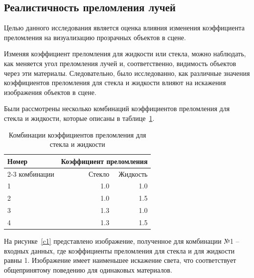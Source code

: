 \subsection{Реалистичность преломления лучей}

Целью данного исследования является оценка влияния изменения коэффициента преломления на визуализацию прозрачных объектов в сцене.

Изменяя коэффициент преломления для жидкости или стекла, можно наблюдать, как меняется угол преломления лучей и, соответственно, видимость объектов через эти материалы. Следовательно, было исследованно, как различные значения коэффициентов преломления для стекла и жидкости влияют на искажения изображения объектов в сцене.

Были рассмотрены несколько комбинаций коэффициентов преломления для стекла и жидкости, которые описаны в таблице~\ref{comb}.

\begin{table}[ht!]
	\begin{center}
		\caption{Комбинации коэффициентов преломления для стекла и жидкости}
		\begin{tabular}{ ||p{3cm}||r|r||  }
			\hline
			\multirow{2}{*}{Номер}& \multicolumn{2}{c||}{Коэффициент преломления} \\[1.5ex]
			\cline{2-3} 
			комбинации& ~~~~~~~Стекло & Жидкость \\ [1.5ex] 
			\hline\hline
			1 & 1.0 & 1.0 \\
			2 & 1.0 & 1.5 \\
			3 & 1.3 & 1.0 \\
			4 & 1.3 & 1.5 \\
			\hline
		\end{tabular}
		\label{comb}
	\end{center}
\end{table}

На рисунке~\ref{c1} представлено изображение, полученное для комбинации №1 -- входных данных, где коэффициенты преломления для стекла и для жидкости равны 1. Изображение имеет наименьшее искажение света, что соответствует общепринятому поведению для одинаковых материалов.

